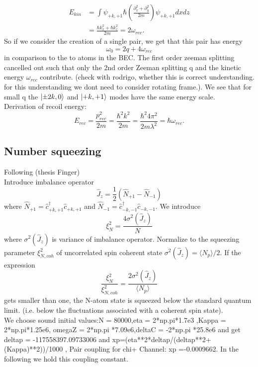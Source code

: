 \begin{align}
	E_{kin} &= \int \psi_{+k,+1} \hbar \left ( \frac{\partial_x^2 + \partial_y^2}{2m} \right) \psi_{+k,+1} dx dz
	\\
	& =\frac{\hbar k_x^2 + \hbar k_z^2}{2m} = 2 \omega_{rec}.
\end{align}
So if we consider the creation of a single pair, we get that this pair has energy 
\begin{equation}
	\omega_0 = 2q + 4 \omega_{rec}
\end{equation} 
in comparison to the to atoms in the BEC. The first order zeeman splitting cancelled out such that only the 2nd order Zeeman splitting q and the kinetic energy $\omega_{rec}$ contribute. (check with rodrigo, whether this is correct understanding. for this understanding we dont need to consider rotating frame.). We see that for small q the $\ket{\pm 2k,0}$ and $\ket{+k,+1}$ modes have the same energy scale. 
\\
Derivation of recoil energy:
\begin{equation}
	E_{rec} = \frac{p_{rec}^2}{2m} = \frac{\hbar^2 k^2}{2m} = \frac{\hbar^2 4 \pi^2}{2 m \lambda^2} = \hbar \omega_{rec}.
\end{equation}
\subsection{Number squeezing}\label{sec:fou_relative_number_squeezing}
Following (thesis Finger)
\\
Introduce imbalance operator
\begin{equation}\label{eq:fou_def_imbalance_op}
	\hat{J}_z = \frac{1}{2} (\hat{N}_{+1}- \hat{N}_{-1})
\end{equation}
where $\hat{N}_{+1} = \hat{c}_{+k,+1}^\dag \hat{c}_{+k,+1}$ and $\hat{N}_{-1} = \hat{c}_{-k,-1}^\dag \hat{c}_{-k,-1}$. 
We introduce 
\begin{equation}
	\xi_N^2 = \frac{4 \sigma^2(\hat{J}_z)}{N}
\end{equation}
where $\sigma^2(\hat{J}_z)$ is variance of imbalance operator. Normalize to the squeezing parameter $\xi_{N,coh}^2$ of uncorrelated spin coherent state $\sigma^2(\hat{J}_z) = \langle N_p \rangle / 2$. If the expression
\begin{equation}
	\frac{\xi_N^2}{\xi^2_{N,coh}} = \frac{2 \sigma^2(\hat{J}_z)}{\langle N_p \rangle}
\end{equation} 
gets smaller than one, the N-atom state is squeezed below the standard quantum limit. (i.e. below the fluctuations associated with a coherent spin state). 
\\
We choose sound initial values:N = 80000,eta = 2*np.pi*1.7e3 ,Kappa = 2*np.pi*1.25e6, omegaZ = 2*np.pi *7.09e6,deltaC = -2*np.pi *25.8e6 and get deltap = -117558397.09733006 and xp=(eta**2*deltap/(deltap**2+(Kappa)**2))/1000 , Pair coupling for chi+ Channel: xp =-0.0009662. In the following we hold this coupling constant.

